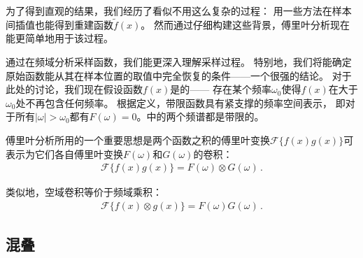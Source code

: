 为了得到直观的结果，我们经历了看似不用这么复杂的过程：
用一些方法在样本间插值也能得到重建函数$\tilde{f}(x)$。
然而通过仔细构建这些背景，傅里叶分析现在能更简单地用于该过程。

通过在频域分析采样函数，我们能更深入理解采样过程。
特别地，我们将能确定原始函数能从其在样本位置的取值中完全恢复的条件——一个很强的结论。
对于此处的讨论，我们现在假设函数$f(x)$是的——
存在某个频率$\omega_0$使得$f(x)$在大于$\omega_0$处不再包含任何频率。
根据定义，带限函数具有紧支撑的频率空间表示，
即对于所有$|\omega|>\omega_0$都有$F(\omega)=0$。中的两个频谱都是带限的。

傅里叶分析所用的一个重要思想是两个函数之积的傅里叶变换$\mathcal{F}\{f(x)g(x)\}$可
表示为它们各自傅里叶变换$F(\omega)$和$G(\omega)$的卷积：
\begin{align*}
    \mathcal{F}\{f(x)g(x)\}=F(\omega)\otimes G(\omega)\, .
\end{align*}

类似地，空域卷积等价于频域乘积：
\begin{align}\label{eq:7.3}
    \mathcal{F}\{f(x)\otimes g(x)\}=F(\omega)G(\omega)\, .
\end{align}


\subsection{混叠}\label{sub:混叠}
